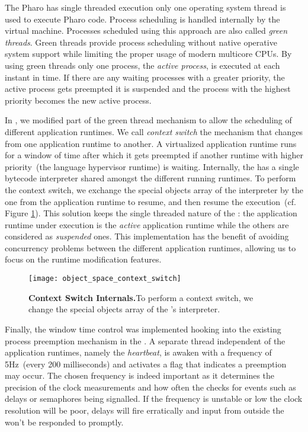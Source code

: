 The Pharo \VM has single threaded execution \ie only one operating system thread is used to execute Pharo code. Process scheduling is handled internally by the virtual machine. Processes scheduled using this approach are also called \emph{green threads}. Green threads provide process scheduling without native operative system support while limiting the proper usage of modern multicore CPUs. By using green threads only one process, the \emph{active process}, is executed at each instant in time. If there are any waiting processes with a greater priority, the active process gets preempted \ie it is suspended and the process with the highest priority becomes the new active process.

In \Vtt, we modified part of the green thread mechanism to allow the scheduling of different application runtimes. We call \emph{context switch} the mechanism that changes from one application runtime to another. A virtualized application runtime runs for a window of time after which it gets preempted if another runtime with higher priority~(the language hypervisor runtime) is waiting. Internally, the \VM has a single bytecode interpreter shared amongst the different running runtimes. To perform the context switch, we exchange the special objects array of the \VM interpreter by the one from the application runtime to resume, and then resume the \VM execution~(cf. Figure \ref{fig:context_switch}). This solution keeps the single threaded nature of the \VM: the application runtime under execution is the \emph{active} application runtime while the others are considered as \emph{suspended} ones. This implementation has the benefit of avoiding concurrency problems between the different application runtimes, allowing us to focus on the runtime modification features.

\begin{figure}[ht]
\begin{center}
\texttt{[image: object\_space\_context\_switch]}
\caption{\textbf{Context Switch Internals.}To perform a context switch, we change the special objects array of the \VM's interpreter.\label{fig:context_switch}}
\end{center}
\end{figure}

Finally, the window time control was implemented hooking into the existing process preemption mechanism in the \VM. A separate \VM thread independent of the application runtimes, namely the \emph{heartbeat}, is awaken with a frequency of 5Hz~(\ie every 200 milliseconds) and activates a flag that indicates a preemption may occur. The chosen frequency is indeed important as it determines the precision of the clock measurements and how often the \VM checks for events such as delays or semaphores being signalled. If the frequency is unstable or low the clock resolution will be poor, delays will fire erratically and input from outside the \VM won't be responded to promptly.

